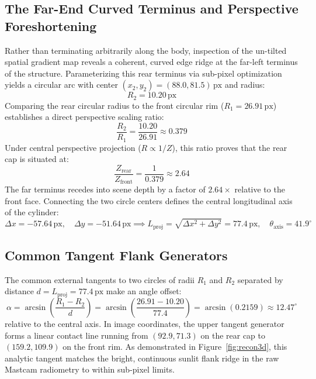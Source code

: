 \documentclass[11pt,a4paper]{article}
\begin{document}
\subsection{The Far-End Curved Terminus and Perspective Foreshortening}
Rather than terminating arbitrarily along the body, inspection of the un-tilted spatial gradient map reveals a coherent, curved edge ridge at the far-left terminus of the structure. Parameterizing this rear terminus via sub-pixel optimization yields a circular arc with center $(x_2, y_2) = (88.0, 81.5)\,\text{px}$ and radius:
\begin{equation}
    R_2 = 10.20\,\text{px}
\end{equation}
Comparing the rear circular radius to the front circular rim ($R_1 = 26.91\,\text{px}$) establishes a direct perspective scaling ratio:
\begin{equation}
    \frac{R_2}{R_1} = \frac{10.20}{26.91} \approx 0.379
\end{equation}
Under central perspective projection ($R \propto 1/Z$), this ratio proves that the rear cap is situated at:
\begin{equation}
    \frac{Z_{\text{rear}}}{Z_{\text{front}}} = \frac{1}{0.379} \approx 2.64
\end{equation}
The far terminus recedes into scene depth by a factor of $2.64\times$ relative to the front face. Connecting the two circle centers defines the central longitudinal axis of the cylinder:
\begin{equation}
    \Delta x = -57.64\,\text{px}, \quad \Delta y = -51.64\,\text{px} \implies L_{\text{proj}} = \sqrt{\Delta x^2 + \Delta y^2} = 77.4\,\text{px}, \quad \theta_{\text{axis}} = 41.9^\circ
\end{equation}

\subsection{Common Tangent Flank Generators}
The common external tangents to two circles of radii $R_1$ and $R_2$ separated by distance $d = L_{\text{proj}} = 77.4\,\text{px}$ make an angle offset:
\begin{equation}
    \alpha = \arcsin\left(\frac{R_1 - R_2}{d}\right) = \arcsin\left(\frac{26.91 - 10.20}{77.4}\right) = \arcsin(0.2159) \approx 12.47^\circ
\end{equation}
relative to the central axis. In image coordinates, the upper tangent generator forms a linear contact line running from $(92.9, 71.3)$ on the rear cap to $(159.2, 109.9)$ on the front rim. As demonstrated in Figure~\ref{fig:recon3d}, this analytic tangent matches the bright, continuous sunlit flank ridge in the raw Mastcam radiometry to within sub-pixel limits.
\end{document}
